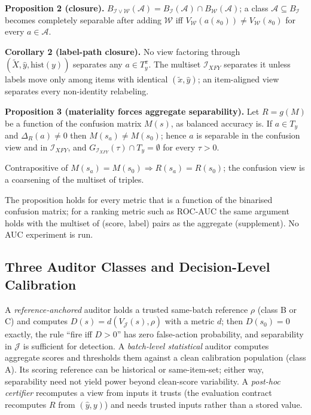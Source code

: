 \documentclass[10pt,journal,compsoc]{IEEEtran}
\newcommand{\IXFY}{\mathcal I_{XFY}}
\begin{document}
\textbf{Proposition 2 (closure).}
$B_{\mathcal I\vee\mathcal W}(\mathcal A)=B_{\mathcal I}(\mathcal A)\cap B_{\mathcal W}(\mathcal A)$;
a class $\mathcal A\subseteq B_{\mathcal I}$ becomes completely separable
after adding $\mathcal W$ iff $V_{\mathcal W}(a(s_0))\ne V_{\mathcal W}(s_0)$
for every $a\in\mathcal A$.

\textbf{Corollary 2 (label-path closure).} No view factoring through
$(\tilde X,\hat y,\mathrm{hist}(y))$ separates any $a\in T_y^{\pi}$.
The multiset $\IXFY$ separates it unless labels move only among items with
identical $(\tilde x,\hat y)$; an item-aligned view separates every
non-identity relabeling.

\textbf{Proposition 3 (materiality forces aggregate separability).} Let
$R=g(M)$ be a function of the confusion matrix $M(s)$, as balanced accuracy
is. If $a\in T_y$ and $\Delta_R(a)\ne0$ then $M(s_a)\ne M(s_0)$; hence $a$ is
separable in the confusion view and in $\IXFY$, and
$G_{\IXFY}(\tau)\cap T_y=\emptyset$ for every $\tau>0$.

\begin{IEEEproof}
Contrapositive of $M(s_a)=M(s_0)\Rightarrow R(s_a)=R(s_0)$; the confusion view
is a coarsening of the multiset of triples.
\end{IEEEproof}

The proposition holds for every metric that is a function of the binarised
confusion matrix; for a ranking metric such as ROC-AUC the same argument holds
with the multiset of (score, label) pairs as the aggregate (supplement). No
AUC experiment is run.

\subsection{Three Auditor Classes and Decision-Level Calibration}

A \emph{reference-anchored} auditor holds a trusted same-batch reference
$\rho$ (class B or C) and computes $D(s)=d(V_{\mathcal J}(s),\rho)$ with a
metric $d$; then $D(s_0)=0$ exactly, the rule ``fire iff $D>0$'' has zero
false-action probability, and separability in $\mathcal J$ is sufficient for
detection. A \emph{batch-level statistical} auditor computes aggregate
scores and thresholds them against a clean calibration population (class A).
Its scoring reference can be historical or same-item-set; either way,
separability need not yield power beyond clean-score variability. A
\emph{post-hoc certifier}
recomputes a view from inputs it trusts (the evaluation contract recomputes
$R$ from $(\hat y,y)$) and needs trusted inputs rather than a stored value.
\end{document}
